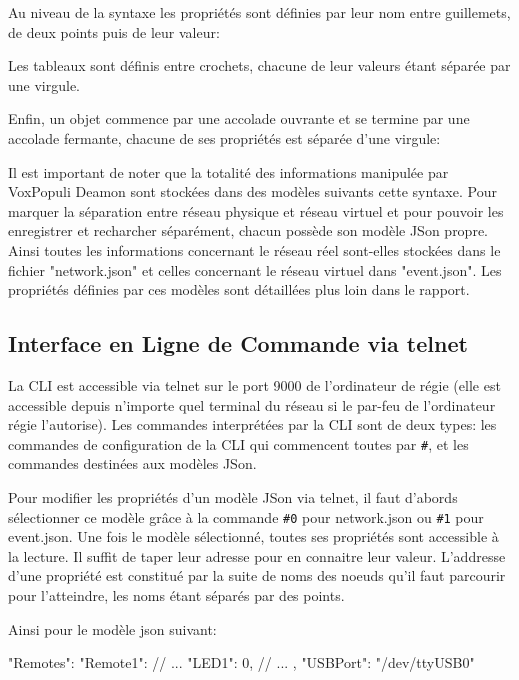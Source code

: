 \documentclass{Rapport}
\begin{document}
Au niveau de la syntaxe les propriétés sont définies par leur nom entre guillemets, de deux points puis de leur valeur:

Les tableaux sont définis entre crochets, chacune de leur valeurs étant séparée par une virgule.

Enfin, un objet commence par une accolade ouvrante et se termine par une accolade fermante, chacune de ses propriétés est séparée d'une virgule:

Il est important de noter que la totalité des informations manipulée par VoxPopuli Deamon sont stockées dans des modèles suivants cette syntaxe. Pour marquer la séparation entre réseau physique et réseau virtuel et pour pouvoir les enregistrer et recharcher séparément, chacun possède son modèle JSon propre. Ainsi toutes les informations concernant le réseau réel sont-elles stockées dans le fichier "network.json" et celles concernant le réseau virtuel dans "event.json".  Les propriétés définies par ces modèles sont détaillées plus loin dans le rapport.

\subsection*{Interface en Ligne de Commande via telnet}
La CLI est accessible via telnet sur le port 9000 de l'ordinateur de régie (elle est accessible depuis n'importe quel terminal du réseau si le par-feu de l'ordinateur régie l'autorise). Les commandes interprétées par la CLI sont de deux types: les commandes de configuration de la CLI qui commencent toutes par \verb|#|, et les commandes destinées aux modèles JSon.

Pour modifier les propriétés d'un modèle JSon via telnet, il faut d'abords sélectionner ce modèle grâce à la commande \verb|#0| pour network.json ou \verb|#1| pour event.json. Une fois le modèle sélectionné, toutes ses propriétés sont accessible à la lecture. Il suffit de taper leur adresse pour en connaitre leur valeur. L'addresse d'une propriété est constitué par la suite de noms des noeuds qu'il faut parcourir pour l'atteindre, les noms étant séparés par des points.

Ainsi pour le modèle json suivant:
\begin{Cpp}
{
	"Remotes": {
		"Remote1": {
			// ...
			"LED1": 0,
			// ...
		}
	},
	"USBPort": "/dev/ttyUSB0"
}
\end{Cpp}
\end{document}
